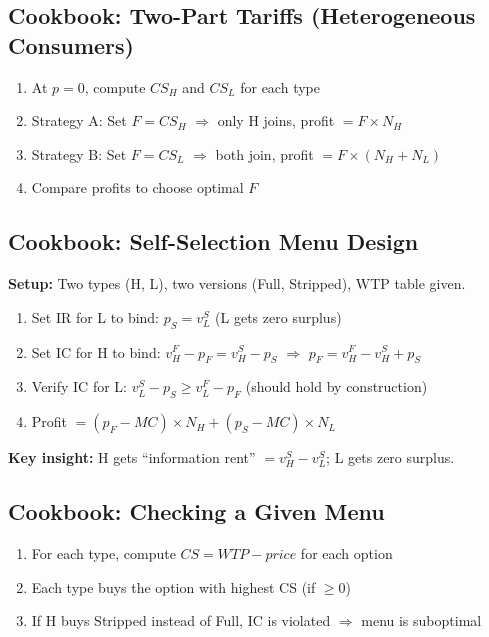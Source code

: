 \documentclass[11pt]{article}
\begin{document}
\subsection{Cookbook: Two-Part Tariffs (Heterogeneous Consumers)}
\begin{enumerate}
	\item At $p = 0$, compute $CS_H$ and $CS_L$ for each type
	\item Strategy A: Set $F = CS_H$ $\Rightarrow$ only H joins, profit $= F \times N_H$
	\item Strategy B: Set $F = CS_L$ $\Rightarrow$ both join, profit $= F \times (N_H + N_L)$
	\item Compare profits to choose optimal $F$
\end{enumerate}

\subsection{Cookbook: Self-Selection Menu Design}
\textbf{Setup:} Two types (H, L), two versions (Full, Stripped), WTP table given.
\begin{enumerate}
	\item Set IR for L to bind: $p_S = v_L^S$ (L gets zero surplus)
	\item Set IC for H to bind: $v_H^F - p_F = v_H^S - p_S$ $\Rightarrow$ $p_F = v_H^F - v_H^S + p_S$
	\item Verify IC for L: $v_L^S - p_S \geq v_L^F - p_F$ (should hold by construction)
	\item Profit $= (p_F - MC) \times N_H + (p_S - MC) \times N_L$
\end{enumerate}
\textbf{Key insight:} H gets ``information rent'' $= v_H^S - v_L^S$; L gets zero surplus.

\subsection{Cookbook: Checking a Given Menu}
\begin{enumerate}
	\item For each type, compute $CS = WTP - price$ for each option
	\item Each type buys the option with highest CS (if $\geq 0$)
	\item If H buys Stripped instead of Full, IC is violated $\Rightarrow$ menu is suboptimal
\end{enumerate}
\end{document}
